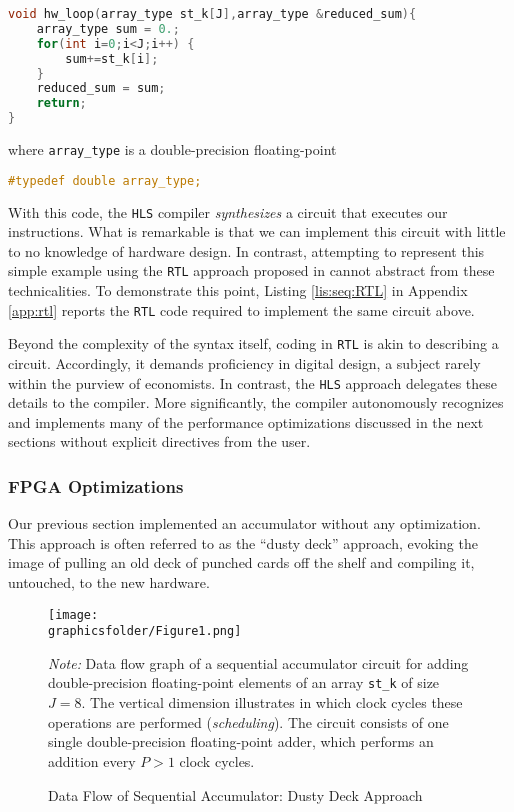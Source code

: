 \documentclass[12pt,american]{article}
\newcommand{\Naccsize}{J}
\newcommand{\graphicsfolder}{./graphics}
\begin{document}
\begin{lstlisting}[language=C,caption= Sequential Accumulator,basicstyle=\footnotesize,label=list:acc:seq]
void hw_loop(array_type st_k[J],array_type &reduced_sum){
    array_type sum = 0.;
    for(int i=0;i<J;i++) {
        sum+=st_k[i];
    }
    reduced_sum = sum;
    return;
}
\end{lstlisting}
where \texttt{array\_type} is a double-precision floating-point
\begin{lstlisting}[language=C,basicstyle=\footnotesize]
#typedef double array_type;	
\end{lstlisting}

With this code, the \texttt{HLS} compiler \textit{synthesizes} a circuit that executes our instructions. What is remarkable is that we can implement this circuit with little to no knowledge of hardware design. In contrast, attempting to represent this simple example using the \texttt{RTL} approach proposed in \citet{Peri2020} cannot abstract from these technicalities. To demonstrate this point, Listing \ref{lis:seq:RTL} in Appendix \ref{app:rtl} reports the \texttt{RTL} code required to implement the same circuit above. 

Beyond the complexity of the syntax itself, coding in \texttt{RTL} is akin to describing a circuit.  Accordingly, it demands proficiency in digital design, a subject rarely within the purview of economists. In contrast, the \texttt{HLS} approach delegates these details to the compiler. More significantly, the compiler autonomously recognizes and implements many of the performance optimizations discussed in the next sections without explicit directives from the user. 

\subsubsection{FPGA Optimizations} 

Our previous section implemented an accumulator without any optimization. This approach is often referred to as the ``dusty deck'' approach, evoking the image of pulling an old deck of punched cards off the shelf and compiling it, untouched, to the new hardware.

\begin{figure}[ht!]
\caption{Data Flow of Sequential Accumulator: Dusty Deck Approach}
\begin{center}
\texttt{[image: \\graphicsfolder/Figure1.png]}
\end{center}
\label{fig:acc:baseline}
\small \textit{Note:} Data flow graph of a sequential accumulator circuit for adding double-precision floating-point elements of an array \texttt{st\_k} of size $\Naccsize=8$. The vertical dimension illustrates in which clock cycles these operations are performed (\textit{scheduling}). The circuit consists of one single double-precision floating-point adder, which performs an addition every $P>1$ clock cycles.
\end{figure}
\end{document}
